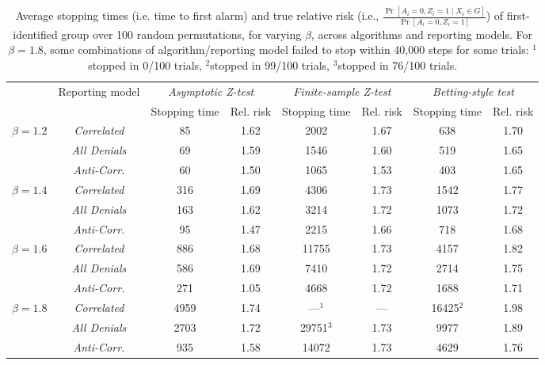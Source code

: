 {\begin{table*}[ht]
\centering
\begin{tabular}{c|c|cc|cc|cc}
  \toprule
  \multirow{2}{*}{} & \multirow{2}{*}{\small{Reporting model}} &
  \multicolumn{2}{c|}{\textit{Asymptotic Z-test}} &
  \multicolumn{2}{c|}{\textit{Finite-sample Z-test}} &
  \multicolumn{2}{c}{\textit{Betting-style test}}~\\
  & & {\small{Stopping time}} & {\small{Rel. risk}} & {\small{Stopping time}} & {\small{Rel. risk}} & {\small{Stopping time}} & {\small{Rel. risk}} \\
  \hline\hline
  \multirow{3}{*}{$\beta=1.2$} & \textit{Correlated} & 85 & 1.62 & 2002 & 1.67 & 638 & 1.70 \\
  & \textit{All Denials} & 69 & 1.59 & 1546& 1.60 & 519 & 1.65 \\
  & \textit{Anti-Corr.} & 60 & 1.50 & 1065 & 1.53 & 403 & 1.65 \\
  \hline
    \multirow{3}{*}{$\beta=1.4$} & \textit{Correlated} & 316 & 1.69 & 4306 & 1.73 & 1542 & 1.77 \\
  & \textit{All Denials} & 163 & 1.62 & 3214 & 1.72 & 1073 & 1.72 \\
  & \textit{Anti-Corr.} & 95 & 1.47 & 2215 & 1.66 & 718 & 1.68 \\
  \hline
    \multirow{3}{*}{$\beta=1.6$} & \textit{Correlated} & 886 & 1.68 & 11755 & 1.73 & 4157 & 1.82 \\
  & \textit{All Denials} & 586 & 1.69 & 7410 & 1.72 & 2714 & 1.75 \\
  & \textit{Anti-Corr.} & 271 & 1.05 & 4668 & 1.72 & 1688 & 1.71 \\
  \hline
    \multirow{3}{*}{$\beta=1.8$} & \textit{Correlated} & 4959 & 1.74 & ---$^1$ & --- & 16425$^2$ & 1.98 \\
  & \textit{All Denials} & 2703 & 1.72 & 29751$^3$ & 1.73 & 9977 & 1.89 \\
  & \textit{Anti-Corr.} & 935 & 1.58 & 14072 & 1.73 & 4629 & 1.76 \\
  \hline
\end{tabular}
\vspace{1em}
\caption{Average stopping times (i.e. time to first alarm) and true relative risk (i.e., $\frac{\Pr[A_i = 0, Z_i = 1 \mid X_i \in G]}{\Pr[A_i = 0, Z_i = 1]}$) of first-identified group over 100 random permutations, for varying $\beta$, across algorithms and reporting models.
For $\beta=1.8$, some combinations of algorithm/reporting model failed to stop within 40,000 steps for some trials: 
$^1$stopped in 0/100 trials, $^2$stopped in 99/100 trials, $^3$stopped in 76/100 trials.}
\label{table:hmda-all}
\end{table*}
}{}